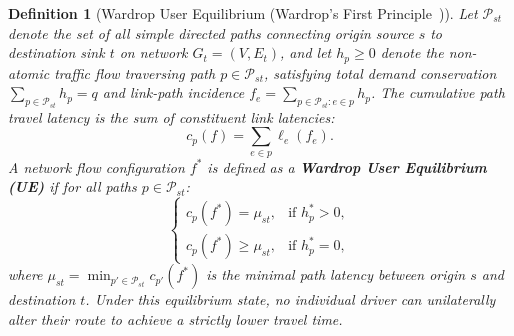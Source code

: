 \documentclass[11pt,a4paper]{article}
\newtheorem{definition}{Definition}
\begin{document}
\begin{itemize}
    \begin{definition}[Wardrop User Equilibrium (Wardrop's First Principle~\cite{wardrop1952road})]
    \label{def:wardrop_equilibrium}
    Let $\mathcal{P}_{st}$ denote the set of all simple directed paths connecting origin source $s$ to destination sink $t$ on network $G_t = (V, E_t)$, and let $h_p \ge 0$ denote the non-atomic traffic flow traversing path $p \in \mathcal{P}_{st}$, satisfying total demand conservation $\sum_{p \in \mathcal{P}_{st}} h_p = q$ and link-path incidence $f_e = \sum_{p \in \mathcal{P}_{st}: e \in p} h_p$. The cumulative path travel latency is the sum of constituent link latencies:
    \begin{equation}
    c_p(f) = \sum_{e \in p} \ell_e(f_e).
    \end{equation}
    A network flow configuration $f^*$ is defined as a \textbf{Wardrop User Equilibrium (UE)} if for all paths $p \in \mathcal{P}_{st}$:
    \begin{equation}
    \label{eq:wardrop_equilibrium}
    \begin{cases}
    c_p(f^*) = \mu_{st}, & \text{if } h_p^* > 0, \\
    c_p(f^*) \ge \mu_{st}, & \text{if } h_p^* = 0,
    \end{cases}
    \end{equation}
    where $\mu_{st} = \min_{p' \in \mathcal{P}_{st}} c_{p'}(f^*)$ is the minimal path latency between origin $s$ and destination $t$. Under this equilibrium state, no individual driver can unilaterally alter their route to achieve a strictly lower travel time.
    \end{definition}


\end{itemize}
\end{document}

